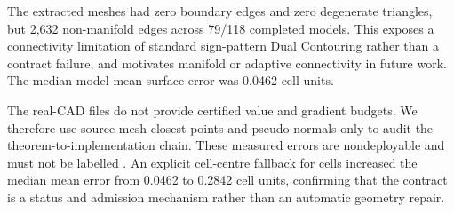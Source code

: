The extracted meshes had zero boundary edges and zero degenerate triangles, but
2,632 non-manifold edges across 79/118 completed models.  This exposes a
connectivity limitation of standard sign-pattern Dual Contouring rather than a
contract failure, and motivates manifold or adaptive connectivity in future
work.  The median model mean surface error was 0.0462 cell units.

The real-CAD files do not provide certified value and gradient budgets.  We
therefore use source-mesh closest points and pseudo-normals only to audit the
theorem-to-implementation chain.  These measured errors are nondeployable and
must not be labelled \Certified.  An explicit cell-centre fallback for
\Unknown cells increased the median mean error from 0.0462 to
0.2842 cell units, confirming that the contract is a status and
admission mechanism rather than an automatic geometry repair.
